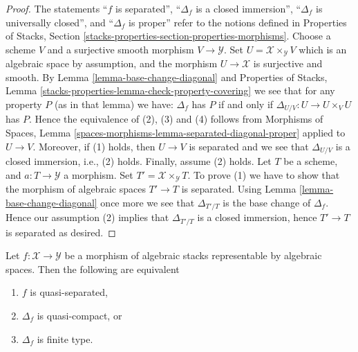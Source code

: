 \begin{proof}
The statements
``$f$ is separated'',
``$\Delta_f$ is a closed immersion'',
``$\Delta_f$ is universally closed'', and
``$\Delta_f$ is proper''
refer to the notions defined in
Properties of Stacks,
Section \ref{stacks-properties-section-properties-morphisms}.
Choose a scheme $V$ and a surjective smooth morphism $V \to \mathcal{Y}$.
Set $U = \mathcal{X} \times_{\mathcal{Y}} V$ which is an algebraic
space by assumption, and the morphism $U \to \mathcal{X}$ is surjective
and smooth. By
Lemma \ref{lemma-base-change-diagonal}
and
Properties of Stacks,
Lemma \ref{stacks-properties-lemma-check-property-covering}
we see that for any property $P$ (as in that lemma) we have:
$\Delta_f$ has $P$ if and only if $\Delta_{U/V} : U \to  U \times_V U$ has $P$.
Hence the equivalence of (2), (3) and (4) follows from
Morphisms of Spaces,
Lemma \ref{spaces-morphisms-lemma-separated-diagonal-proper}
applied to $U \to V$.
Moreover, if (1) holds, then $U \to V$ is separated and we see that
$\Delta_{U/V}$ is a closed immersion, i.e., (2) holds.
Finally, assume (2) holds. Let $T$ be a scheme, and $a : T \to \mathcal{Y}$
a morphism. Set $T' = \mathcal{X} \times_{\mathcal{Y}} T$. To prove
(1) we have to show that the morphism of algebraic spaces $T' \to T$
is separated. Using
Lemma \ref{lemma-base-change-diagonal}
once more we see that $\Delta_{T'/T}$ is the base change of
$\Delta_f$. Hence our assumption (2) implies that $\Delta_{T'/T}$
is a closed immersion, hence $T' \to T$ is separated as desired.
\end{proof}

\begin{lemma}
\label{lemma-representable-quasi-separated-diagonal-quasi-compact}
Let $f : \mathcal{X} \to \mathcal{Y}$ be a morphism of algebraic stacks
representable by algebraic spaces. Then the following are equivalent
\begin{enumerate}
\item $f$ is quasi-separated,
\item $\Delta_f$ is quasi-compact, or
\item $\Delta_f$ is finite type.
\end{enumerate}
\end{lemma}

